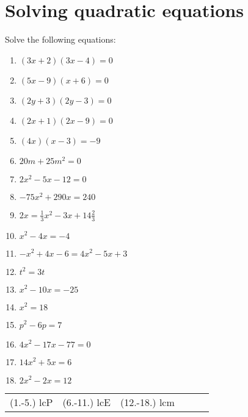 \section{Solving quadratic equations}
\begin{exercises}{ }
{
Solve the following equations:
\begin{multicols}{2}
\begin{enumerate}[itemsep=5pt, label=\textbf{\arabic*}. ] 
\item  $(3x+2)(3x-4)=0$
\item  $(5x-9)(x+6)=0$
\item  $(2y+3)(2y-3)=0$ 
\item  $(2x+1)(2x-9)=0$    
\item  $(4x)(x-3)=-9$       
\item  $20m+25{m}^{2}=0$
\item  $2{x}^{2}-5x-12=0$  
\item  $-75{x}^{2}+290x=240$
\item  $2x=\frac{1}{3}{x}^{2}-3x+14\frac{2}{3}$
\item  ${x}^{2}-4x=-4$      
\item  $-{x}^{2}+4x-6=4{x}^{2}-5x+3$       
\item  ${t}^{2}=3t$  
\item  ${x}^{2}-10x=-25$      
\item  ${x}^{2}=18$
\item  ${p}^{2}-6p=7$
\item  $4{x}^{2}-17x-77=0$
\item  $14{x}^{2}+5x=6$
\item  $2{x}^{2}-2x=12$              
\end{enumerate}
\end{multicols}
\practiceinfo
\par 
\par\begin{tabular}[h]{cccccc}
(1.-5.) lcP  &  (6.-11.) lcE  &  (12.-18.) lcm \end{tabular}
}
\end{exercises}


